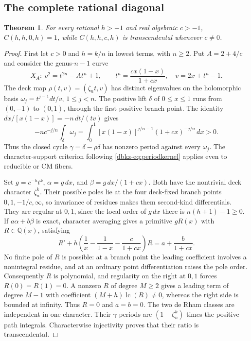 \documentclass[11pt,a4paper]{article}
\newtheorem{theorem}{Theorem}[section]
\theoremstyle{definition}
\theoremstyle{remark}
\numberwithin{equation}{section}
\begin{document}
\subsection{The complete rational diagonal}
\label{dbkz-sec:diagonal}
\begin{theorem}\label{dbkz-thm:diagonal}
For every rational $h>-1$ and real algebraic $c>-1$,
$C(h,h,0,h)=1$, while $C(h,h,c,h)$ is transcendental whenever $c\ne0$.
\end{theorem}
\begin{proof}
First let $c>0$ and $h=k/n$ in lowest terms, with $n\ge2$. Put
$A=2+4/c$ and consider the genus-$n-1$ curve
\[
 X_A:\ v^2=t^{2n}-At^n+1,\qquad
 t^n=\frac{cx(1-x)}{1+cx},\quad v=2x+t^n-1.
\]
The deck map $\rho(t,v)=(\zeta_nt,v)$ has distinct eigenvalues on the
holomorphic basis $\omega_j=t^{j-1}dt/v$, $1\le j<n$.
The positive lift $\delta$ of $0\le x\le1$ runs from $(0,-1)$ to
$(0,1)$, through the first positive branch point. The identity
$dx/[x(1-x)]=-n\,dt/(tv)$ gives
\[
 -nc^{-j/n}\int_\delta\omega_j
 =\int_0^1[x(1-x)]^{j/n-1}(1+cx)^{-j/n}\,dx>0.
\]
Thus the closed cycle $\gamma=\delta-\rho\delta$ has nonzero period
against every $\omega_j$. The character-support criterion following
\eqref{dbkz-eq:periodkernel} applies even to reducible or CM fibers.

Set $g=c^{-h}t^k$, $\alpha=g\,dx$, and
$\beta=g\,dx/(1+cx)$. Both have the nontrivial deck character
$\zeta_n^k$. Their possible poles lie at the four deck-fixed branch
points $0,1,-1/c,\infty$, so invariance of residues makes them
second-kind differentials. They are regular at $0,1$, since the local
order of $g\,dx$ there is $n(h+1)-1\ge0$.
If $a\alpha+b\beta$ is exact, character averaging gives a primitive
$gR(x)$ with $R\in\overline{\mathbb Q}(x)$, satisfying
\begin{equation}\label{dbkz-eq:diagexact}
 R'+h\left(\frac1x-\frac1{1-x}-\frac c{1+cx}\right)R
       =a+\frac b{1+cx}.
\end{equation}
No finite pole of $R$ is possible: at a branch point the leading
coefficient involves a nonintegral residue, and at an ordinary point
differentiation raises the pole order. Consequently $R$ is polynomial,
and regularity on the right at $0,1$ forces $R(0)=R(1)=0$.
A nonzero $R$ of degree $M\ge2$ gives a leading term of degree $M-1$
with coefficient $(M+h)\operatorname{lc}(R)\ne0$, whereas the right
side is bounded at infinity. Thus $R=0$ and $a=b=0$.
The two de Rham classes are independent in one character. Their
$\gamma$-periods are $(1-\zeta_n^k)$ times the positive-path integrals.
Characterwise injectivity proves that their ratio is transcendental.


\end{proof}
\end{document}
